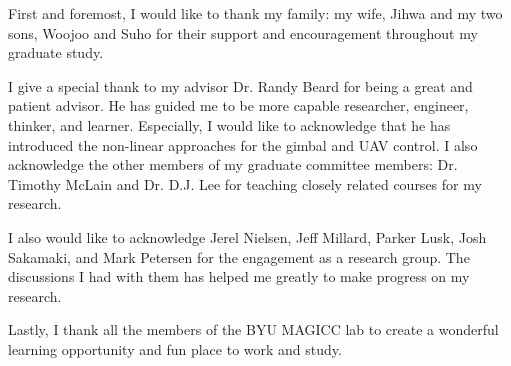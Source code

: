 \afterpage{\cleardoublepage}
%
First and foremost, I would like to thank my family: my wife, Jihwa and my two sons, Woojoo and Suho for their support and encouragement throughout my graduate study. 

I give a special thank to my advisor Dr. Randy Beard for being a great and patient advisor. He has guided me to be more capable researcher, engineer, thinker, and learner. Especially, I would like to acknowledge that he has introduced the non-linear approaches for the gimbal and UAV control. I also acknowledge the other members of my graduate committee members: Dr. Timothy McLain and Dr. D.J. Lee for teaching closely related courses for my research.

I also would like to acknowledge Jerel Nielsen, Jeff Millard, Parker Lusk, Josh Sakamaki, and Mark Petersen for the engagement as a research group. The discussions I had with them has helped me greatly to make progress on my research. 

Lastly, I thank all the members of the BYU MAGICC lab to create a wonderful learning opportunity and fun place to work and study. 